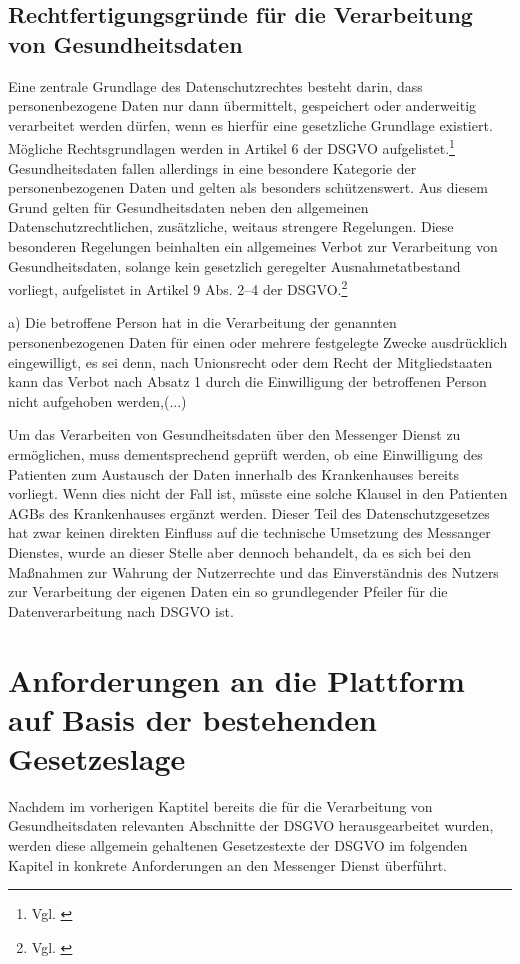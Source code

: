 \subsection{Rechtfertigungsgründe für die Verarbeitung von Gesundheitsdaten}\label{subsection:rfdvvg}
Eine zentrale Grundlage des Datenschutzrechtes besteht darin, dass personenbezogene Daten nur dann übermittelt, gespeichert oder anderweitig verarbeitet werden dürfen, wenn es hierfür eine gesetzliche Grundlage existiert. Mögliche Rechtsgrundlagen werden in Artikel 6 der DSGVO aufgelistet.\footnote{Vgl. \cite[S. 5 f.]{OrientierungshilfezumGesundheitsdatenschutz2018}} Gesundheitsdaten fallen allerdings in eine besondere Kategorie der personenbezogenen Daten und gelten als besonders schützenswert. Aus diesem Grund gelten für Gesundheitsdaten neben den allgemeinen Datenschutzrechtlichen, zusätzliche, weitaus strengere Regelungen. Diese besonderen Regelungen beinhalten ein allgemeines Verbot zur Verarbeitung von Gesundheitsdaten, solange kein gesetzlich geregelter Ausnahmetatbestand vorliegt, aufgelistet in Artikel 9 Abs. 2–4 der DSGVO.\footnote{Vgl. \cite[S. 20 ff.]{OrientierungshilfezumGesundheitsdatenschutz2018}}

a) Die betroffene Person hat in die Verarbeitung der genannten personenbezogenen Daten für einen oder mehrere festgelegte Zwecke ausdrücklich eingewilligt, es sei denn, nach Unionsrecht oder dem Recht der Mitgliedstaaten kann das Verbot nach Absatz 1 durch die Einwilligung der betroffenen Person nicht aufgehoben werden,(...)

Um das Verarbeiten von Gesundheitsdaten über den Messenger Dienst zu ermöglichen, muss dementsprechend geprüft werden, ob eine Einwilligung des Patienten zum Austausch der Daten innerhalb des Krankenhauses bereits vorliegt. Wenn dies nicht der Fall ist, müsste eine solche Klausel in den Patienten AGBs des Krankenhauses ergänzt werden. Dieser Teil des Datenschutzgesetzes hat zwar keinen direkten Einfluss auf die technische Umsetzung des Messanger Dienstes, wurde an dieser Stelle aber dennoch behandelt, da es sich bei den Maßnahmen zur Wahrung der Nutzerrechte und das Einverständnis des Nutzers zur Verarbeitung der eigenen Daten ein so grundlegender Pfeiler für die Datenverarbeitung nach DSGVO ist.

\section{Anforderungen an die Plattform auf Basis der bestehenden Gesetzeslage}\label{section:aadpabsbg}
Nachdem im vorherigen Kaptitel bereits die für die Verarbeitung von Gesundheitsdaten relevanten Abschnitte der DSGVO herausgearbeitet wurden, werden diese allgemein gehaltenen Gesetzestexte der DSGVO im folgenden Kapitel in konkrete Anforderungen an den Messenger Dienst überführt. 


